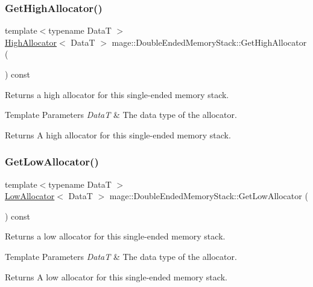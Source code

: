 \subsubsection{\texorpdfstring{Get\+High\+Allocator()}{GetHighAllocator()}}
{\footnotesize\ttfamily template$<$typename DataT $>$ \\
\hyperlink{classmage_1_1_double_ended_memory_stack_1_1_high_allocator}{High\+Allocator}$<$ DataT $>$ mage\+::\+Double\+Ended\+Memory\+Stack\+::\+Get\+High\+Allocator (\begin{DoxyParamCaption}{ }\end{DoxyParamCaption}) const\hspace{0.3cm}{\ttfamily [noexcept]}}

Returns a high allocator for this single-\/ended memory stack.


\begin{DoxyTemplParams}{Template Parameters}
{\em DataT} & The data type of the allocator. \\
\hline
\end{DoxyTemplParams}
\begin{DoxyReturn}{Returns}
A high allocator for this single-\/ended memory stack. 
\end{DoxyReturn}
\hypertarget{classmage_1_1_double_ended_memory_stack_a9ca15b7e92e19744db2b3c9862062006}{}\label{classmage_1_1_double_ended_memory_stack_a9ca15b7e92e19744db2b3c9862062006} 
\subsubsection{\texorpdfstring{Get\+Low\+Allocator()}{GetLowAllocator()}}
{\footnotesize\ttfamily template$<$typename DataT $>$ \\
\hyperlink{classmage_1_1_double_ended_memory_stack_1_1_low_allocator}{Low\+Allocator}$<$ DataT $>$ mage\+::\+Double\+Ended\+Memory\+Stack\+::\+Get\+Low\+Allocator (\begin{DoxyParamCaption}{ }\end{DoxyParamCaption}) const\hspace{0.3cm}{\ttfamily [noexcept]}}

Returns a low allocator for this single-\/ended memory stack.


\begin{DoxyTemplParams}{Template Parameters}
{\em DataT} & The data type of the allocator. \\
\hline
\end{DoxyTemplParams}
\begin{DoxyReturn}{Returns}
A low allocator for this single-\/ended memory stack. 
\end{DoxyReturn}
\hypertarget{classmage_1_1_double_ended_memory_stack_a68d69d69243d5ef8a9fd12b7d7a42993}{}\label{classmage_1_1_double_ended_memory_stack_a68d69d69243d5ef8a9fd12b7d7a42993} 
